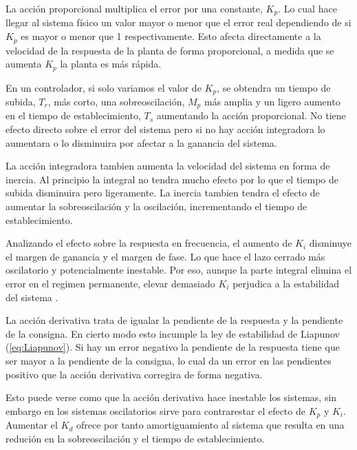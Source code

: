 \documentclass{book}
\begin{document}
La acci\'on proporcional multiplica el error por una constante, $K_p$. Lo cual hace llegar al sistema f\'isico un valor mayor o menor que el error real dependiendo de si $K_p$ es mayor o menor que 1 respectivamente. Esto afecta directamente a la velocidad de la respuesta de la planta de forma proporcional, a medida que se aumenta $K_p$ la planta es m\'as r\'apida. \par

En un controlador, si solo variamos el valor de $K_p$, se obtendra un tiempo de subida, $T_r$, m\'as corto, una sobreoscilaci\'on, $M_p$ m\'as amplia y un ligero aumento en el tiempo de establecimiento, $T_s$ aumentando la acci\'on proporcional. No tiene efecto directo sobre el error del sistema pero si no hay acci\'on integradora lo aumentara o lo disminuira por afectar a la ganancia del sistema. \par

La acci\'on integradora tambien aumenta la velocidad del sistema en forma de inercia. Al principio la integral no tendra mucho efecto por lo que el tiempo de subida disminuira pero ligeramente. La inercia tambien tendra el efecto de aumentar la sobreoscilaci\'on y la oscilaci\'on, incrementando el tiempo de establecimiento. \par

Analizando el efecto sobre la respuesta en frecuencia, el aumento de $K_i$ disminuye el margen de ganancia y el margen de fase. Lo que hace el lazo cerrado m\'as oscilatorio y potencialmente inestable. Por eso, aunque la parte integral elimina el error en el regimen permanente, elevar demasiado $K_i$ perjudica a la estabilidad del sistema \cite{PIDtunning}.  \par

La acci\'on derivativa trata de igualar la pendiente de la respuesta y la pendiente de la consigna. En cierto modo esto incumple la ley de estabilidad de Liapunov (\ref{eq:Liapunov}). Si hay un error negativo la pendiente de la respuesta tiene que ser mayor a la pendiente de la consigna, lo cual da un error en las pendientes positivo que la acci\'on derivativa corregira de forma negativa. \par 

Esto puede verse como que la acci\'on derivativa hace inestable los sistemas, sin embargo en los sistemas oscilatorios sirve para contrarestar el efecto de $K_p$ y $K_i$. Aumentar el $K_d$ ofrece por tanto amortiguamiento al sistema que resulta en una reduci\'on en la sobreoscilaci\'on y el tiempo de establecimiento.\par
\end{document}
